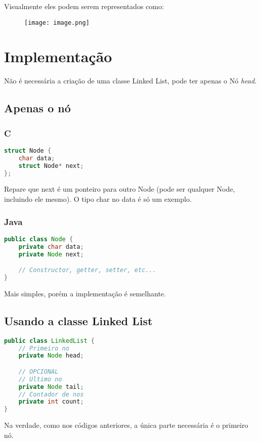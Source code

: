 \documentclass{article}
\begin{document}
Visualmente eles podem serem representados como:
\begin{figure}[h!]
    \centering
    \texttt{[image: image.png]}
\end{figure}

\section{Implementação}

Não é necessária a criação de uma classe Linked List, pode ter apenas o Nó \textit{head}.

\subsection{Apenas o nó}
\subsubsection{C}

\begin{lstlisting}[language=C]
struct Node {
    char data;
    struct Node* next;
};
\end{lstlisting}

Repare que next é um ponteiro para outro Node (pode ser qualquer Node, incluindo ele mesmo). O tipo char no data é só um exemplo.

\subsubsection{Java}
\begin{lstlisting}[language=Java]
public class Node {
    private char data;
    private Node next;

    // Constructor, getter, setter, etc...
}
\end{lstlisting}

Mais simples, porém a implementação é semelhante.

\subsection{Usando a classe Linked List}

\begin{lstlisting}[language=Java]
public class LinkedList {
    // Primeiro no
    private Node head;

    // OPCIONAL
    // Ultimo no
    private Node tail;
    // Contador de nos
    private int count;
}
\end{lstlisting}

Na verdade, como nos códigos anteriores, a única parte necessária é o primeiro nó.
\end{document}
